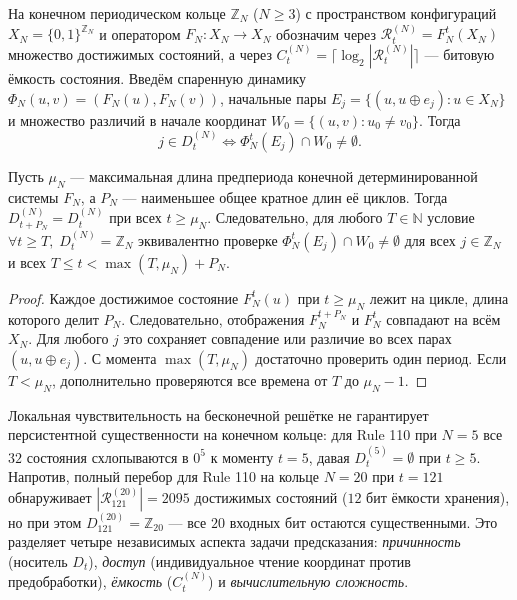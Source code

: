 На конечном периодическом кольце $\mathbb{Z}_N$ ($N \ge 3$) с пространством конфигураций $X_N = \{0, 1\}^{\mathbb{Z}_N}$ и оператором $F_N : X_N \to X_N$ обозначим через $\mathcal{R}_t^{(N)} = F_N^t(X_N)$ множество достижимых состояний, а через $C_t^{(N)} = \lceil \log_2 |\mathcal{R}_t^{(N)}| \rceil$ — битовую ёмкость состояния. Введём спаренную динамику $\Phi_N(u, v) = (F_N(u), F_N(v))$, начальные пары $E_j = \{ (u, u \oplus e_j) : u \in X_N \}$ и множество различий в начале координат $W_0 = \{ (u,v) : u_0 \ne v_0 \}$. Тогда
\begin{equation}
j \in D_t^{(N)} \iff \Phi_N^t(E_j) \cap W_0 \ne \emptyset.
\end{equation}

\begin{proposition}\label{prop:ring_cert}
Пусть $\mu_N$ — максимальная длина предпериода конечной детерминированной системы $F_N$, а $P_N$ — наименьшее общее кратное длин её циклов. Тогда $D_{t+P_N}^{(N)} = D_t^{(N)}$ при всех $t \ge \mu_N$. Следовательно, для любого $T \in \mathbb{N}$ условие $\forall t \ge T,\; D_t^{(N)} = \mathbb{Z}_N$ эквивалентно проверке $\Phi_N^t(E_j) \cap W_0 \ne \emptyset$ для всех $j \in \mathbb{Z}_N$ и всех $T \le t < \max(T, \mu_N) + P_N$.
\end{proposition}

\begin{proof}
Каждое достижимое состояние $F_N^t(u)$ при $t\ge\mu_N$ лежит на цикле, длина которого делит $P_N$. Следовательно, отображения $F_N^{t+P_N}$ и $F_N^t$ совпадают на всём $X_N$. Для любого $j$ это сохраняет совпадение или различие во всех парах $(u,u\oplus e_j)$. С момента $\max(T,\mu_N)$ достаточно проверить один период. Если $T<\mu_N$, дополнительно проверяются все времена от $T$ до $\mu_N-1$.
\end{proof}

\begin{remark}\label{rem:ring5}
Локальная чувствительность на бесконечной решётке не гарантирует персистентной существенности на конечном кольце: для Rule 110 при $N = 5$ все $32$ состояния схлопываются в $0^5$ к моменту $t = 5$, давая $D_t^{(5)} = \emptyset$ при $t \ge 5$. Напротив, полный перебор для Rule 110 на кольце $N = 20$ при $t = 121$ обнаруживает $|\mathcal{R}_{121}^{(20)}| = 2095$ достижимых состояний ($12$ бит ёмкости хранения), но при этом $D_{121}^{(20)} = \mathbb{Z}_{20}$ — все $20$ входных бит остаются существенными. Это разделяет четыре независимых аспекта задачи предсказания: \emph{причинность} (носитель $D_t$), \emph{доступ} (индивидуальное чтение координат против предобработки), \emph{ёмкость} ($C_t^{(N)}$) и \emph{вычислительную сложность}.
\end{remark}

